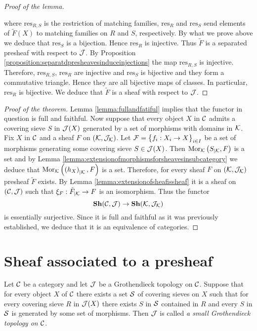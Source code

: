 \begin{proof}[Proof of the lemma]
\begin{center}
\end{center}
where $\mathrm{res}_{R,S}$ is the restriction of matching families, $\mathrm{res}_{R}$ and $\mathrm{res}_{S}$ send elements of $\tilde{F}(X)$ to matching families on $R$ and $S$, respectively. By what we prove above we deduce that $\mathrm{res}_S$ is a bijection. Hence $\mathrm{res}_R$ is injective. Thus $\tilde{F}$ is a separated presheaf with respect to ${\mathcal J}$. By Proposition \ref{proposition:separatdpresheavesinduceinjections} the map $\mathrm{res}_{R,S}$ is injective. Therefore, $\mathrm{res}_{R,S}$, $\mathrm{res}_R$ are injective and $\mathrm{res}_S$ is bijective and they form a commutative triangle. Hence they are all bijective maps of classes. In particular, $\mathrm{res}_R$ is bijective. We deduce that $\tilde{F}$ is a sheaf with respect to ${\mathcal J}$.
\end{proof}

\begin{proof}[Proof of the theorem]
Lemma \ref{lemma:fullandfatiful} implies that the functor in question is full and faithful. Now suppose that every object $X$ in ${\mathcal C}$ admits a covering sieve $S$ in ${\mathcal J}(X)$ generated by a set of morphisms with domains in ${\mathcal K}$. Fix $X$ in ${\mathcal C}$ and a sheaf $F$ on $\left({\mathcal K},{\mathcal J}_{{\mathcal K}}\right)$. Let ${\mathcal F} = \big\{f_i:X_i\rightarrow X\big\}_{i\in I}$ be a set of morphisms generating some covering sieve $S\in {\mathcal J}(X)$. Then $\mathrm{Mor}_{{\mathcal K}}\left(S_{\mid {\mathcal K}},F\right)$ is a set and by Lemma \ref{lemma:extensionofmorphismsforsheavesinsubcategory} we deduce that $\mathrm{Mor}_{{\mathcal K}}\left(\left(h_X\right)_{\mid {\mathcal K}},F\right)$ is a set. Therefore, for every sheaf $F$ on $\left({\mathcal K},{\mathcal J}_{{\mathcal K}}\right)$ presheaf $\tilde{F}$ exists. By Lemma \ref{lemma:extensionofsheafissheaf} it is a sheaf on $\left({\mathcal C},{\mathcal J}\right)$ such that $\xi_{F}:\tilde{F}_{\mid {\mathcal K}}\rightarrow F$ is an isomorphism. Thus the functor
$$\mathbf{Sh}({\mathcal C},{\mathcal J})\rightarrow \mathbf{Sh}({\mathcal K},{\mathcal J}_{{\mathcal K}})$$
is essentially surjective. Since it is full and faithful as it was previously established, we deduce that it is an equivalence of categories.
\end{proof}

\section{Sheaf associated to a presheaf}

\begin{definition}
Let ${\mathcal C}$ be a category and let ${\mathcal J}$ be a Grothendieck topology on ${\mathcal C}$. Suppose that for every object $X$ of ${\mathcal C}$ there exists a set ${\mathcal S}$ of covering sieves on $X$ such that for every covering sieve $R$ in ${\mathcal J}(X)$ there exists $S$ in ${\mathcal S}$ contained in $R$ and every $S$ in ${\mathcal S}$ is generated by some set of morphisms. Then ${\mathcal J}$ is called \textit{a small Grothendieck topology on ${\mathcal C}$}.
\end{definition}

